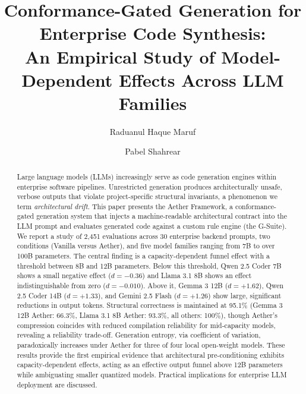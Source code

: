 \documentclass[review,12pt,3p]{elsarticle}
\begin{document}
\begin{frontmatter}

\title{Conformance-Gated Generation for Enterprise Code Synthesis:\\
An Empirical Study of Model-Dependent Effects Across LLM Families}

\author[inst1]{Raduanul Haque Maruf}

\author[inst2]{Pabel Shahrear}




\begin{abstract}
Large language models (LLMs) increasingly serve as code generation engines within
enterprise software pipelines. Unrestricted generation produces architecturally unsafe,
verbose outputs that violate project-specific structural invariants, a phenomenon we
term \emph{architectural drift}. This paper presents the Aether Framework, a
conformance-gated generation system that injects a machine-readable architectural
contract into the LLM prompt and evaluates generated code against a custom rule engine
(the G-Suite). We report a study of 2,451 evaluations across 30 enterprise backend
prompts, two conditions (Vanilla versus Aether), and five model families ranging from
7B to over 100B parameters. The central finding is a capacity-dependent funnel effect
with a threshold between 8B and 12B parameters. Below this threshold, Qwen 2.5 Coder
7B shows a small negative effect ($d = -0.36$) and Llama 3.1 8B shows an effect
indistinguishable from zero ($d = -0.010$). Above it, Gemma 3 12B ($d = +1.62$),
Qwen 2.5 Coder 14B ($d = +1.33$), and Gemini 2.5 Flash ($d = +1.26$) show large,
significant reductions in output tokens. Structural correctness is maintained at
95.1\% (Gemma 3 12B Aether: 66.3\%, Llama 3.1 8B Aether: 93.3\%, all others: 100\%),
though Aether's compression coincides with reduced compilation reliability for
mid-capacity models, revealing a reliability trade-off. Generation entropy, via
coefficient of variation, paradoxically increases under Aether for three of four
local open-weight models. These results provide the first empirical evidence that
architectural pre-conditioning exhibits capacity-dependent effects, acting as an
effective output funnel above 12B parameters while ambiguating smaller quantized
models. Practical implications for enterprise LLM deployment are discussed.
\end{abstract}


\end{frontmatter}
\end{document}
